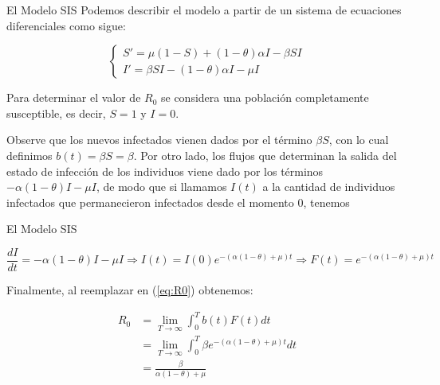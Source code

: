 \documentclass[9pt]{beamer}
\begin{document}
\begin{frame}{El Modelo SIS}
Podemos describir el modelo a partir de un sistema de ecuaciones diferenciales como sigue:

\begin{equation}\label{eq:Modelo SIS}
\left\{
\begin{array}{l}
S' = \mu(1 - S) + (1 - \theta)\alpha I - \beta S I \\
I' = \beta S I - (1 - \theta)\alpha I - \mu I
\end{array}
\right.
\end{equation}

Para determinar el valor de $R_0$ se considera una población completamente susceptible, es decir, $S=1$ y $I=0$.

Observe que los nuevos infectados vienen dados por el término $\beta S$, con lo cual definimos $b(t) = \beta S = \beta$. Por otro lado, los flujos que determinan la salida del estado de infección de los individuos viene dado por los términos $-\alpha(1-\theta)I-\mu I$, de modo que si llamamos $I(t)$ a la cantidad de individuos infectados que permanecieron infectados desde el momento 0, tenemos
\end{frame}

\begin{frame}{El Modelo SIS}

\begin{equation}\label{eq:Cambio en I}
\frac{dI}{dt} = -\alpha(1-\theta)I-\mu I \Longrightarrow I(t) = I(0)e^{-(\alpha(1-\theta)+\mu)t} \Longrightarrow F(t) = e^{-(\alpha(1-\theta)+\mu)t}
\end{equation}

Finalmente, al reemplazar en (\ref{eq:R0}) obtenemos:

\begin{align*}
R_0 &= \lim_{T\to\infty}\int_0^T b(t)F(t) dt \\
&= \lim_{T\to\infty}\int_0^T \beta e^{-(\alpha(1-\theta)+\mu)t} dt\\
&= \frac{\beta}{\alpha(1-\theta)+\mu}
\end{align*}
\end{frame}
\end{document}
